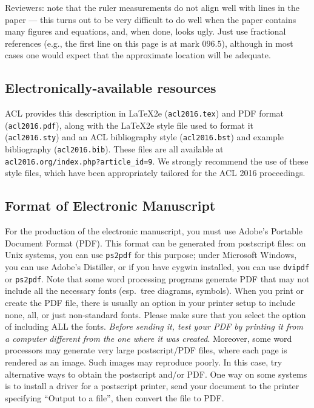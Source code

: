 \documentclass[11pt]{article}
\begin{document}
Reviewers:
note that the ruler measurements do not align well with lines in the paper
--- this turns out to be very difficult to do well when the paper contains
many figures and equations, and, when done, looks ugly.  Just use fractional
references (e.g., the first line on this page is at mark $096.5$), although in most cases one would
expect that the approximate location will be adequate.

\subsection{Electronically-available resources}

ACL provides this description in \LaTeX2e{} ({\small\tt acl2016.tex}) and PDF
format ({\small\tt acl2016.pdf}), along with the \LaTeX2e{} style file used to
format it ({\small\tt acl2016.sty}) and an ACL bibliography style ({\small\tt acl2016.bst})
and example bibliography ({\small\tt acl2016.bib}).
These files are all available at
{\small\tt acl2016.org/index.php?article\_id=9}. We
strongly recommend the use of these style files, which have been
appropriately tailored for the ACL 2016 proceedings.

\subsection{Format of Electronic Manuscript}
\label{sect:pdf}

For the production of the electronic manuscript, you must use Adobe's
Portable Document Format (PDF). This format can be generated from
postscript files: on Unix systems, you can use {\small\tt ps2pdf} for this
purpose; under Microsoft Windows, you can use Adobe's Distiller, or
if you have cygwin installed, you can use {\small\tt dvipdf} or
{\small\tt ps2pdf}.  Note 
that some word processing programs generate PDF that may not include
all the necessary fonts (esp.\ tree diagrams, symbols). When you print
or create the PDF file, there is usually an option in your printer
setup to include none, all, or just non-standard fonts.  Please make
sure that you select the option of including ALL the fonts.  {\em
  Before sending it, test your {\/\em PDF} by printing it from a
  computer different from the one where it was created}. Moreover,
some word processors may generate very large postscript/PDF files,
where each page is rendered as an image. Such images may reproduce
poorly.  In this case, try alternative ways to obtain the postscript
and/or PDF.  One way on some systems is to install a driver for a
postscript printer, send your document to the printer specifying
``Output to a file'', then convert the file to PDF.
\end{document}
